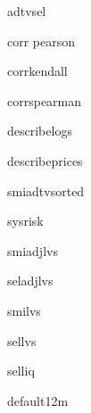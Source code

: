 \documentclass{article}
\begin{document}
adtvsel \newline \newline

\newpage

corr pearson \newline \newline

\newpage

corrkendall \newline \newline

\newpage

corrspearman \newline \newline

\newpage

describelogs \newline \newline

\newpage

describeprices \newline \newline

\newpage

smiadtvsorted \newline \newline

\newpage

sysrisk \newline \newline

\newpage

smiadjlvs \newline \newline

\newpage

seladjlvs \newline \newline

\newpage

smilvs \newline \newline

\newpage

sellvs \newline \newline

\newpage

selliq \newline \newline

\newpage

default12m \newline \newline

\newpage
\end{document}
